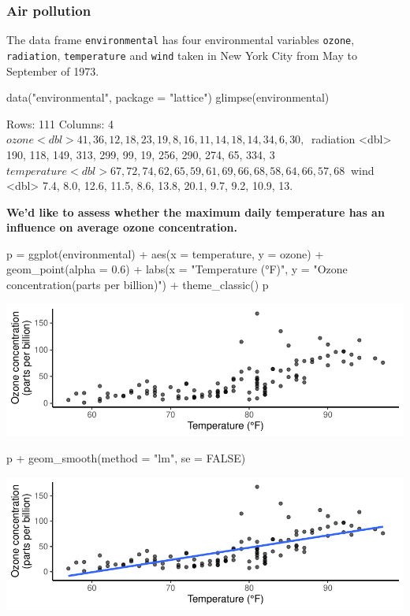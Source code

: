\documentclass[a4paper]{article}
\begin{document}
\subsubsection{Air pollution}
The data frame \lstinline|environmental| has four environmental variables \lstinline|ozone|, \lstinline|radiation|, \lstinline|temperature| and \lstinline|wind| taken in New York City from May to September of 1973.
\begin{Schunk}
\begin{Sinput}
data("environmental", package = "lattice")
glimpse(environmental)
\end{Sinput}
\begin{Soutput}
Rows: 111
Columns: 4
$ ozone       <dbl> 41, 36, 12, 18, 23, 19, 8, 16, 11, 14, 18, 14, 34, 6, 30, ~
$ radiation   <dbl> 190, 118, 149, 313, 299, 99, 19, 256, 290, 274, 65, 334, 3~
$ temperature <dbl> 67, 72, 74, 62, 65, 59, 61, 69, 66, 68, 58, 64, 66, 57, 68~
$ wind        <dbl> 7.4, 8.0, 12.6, 11.5, 8.6, 13.8, 20.1, 9.7, 9.2, 10.9, 13.~
\end{Soutput}
\end{Schunk}
\begin{greenbox}
	\textbf{We'd like to assess whether the maximum daily temperature has an influence on average ozone concentration.}
\end{greenbox}
\begin{Schunk}
\begin{Sinput}
p = ggplot(environmental) + aes(x = temperature, y = ozone) + 
  geom_point(alpha = 0.6) + 
  labs(x = "Temperature (°F)", y = "Ozone concentration\n(parts per billion)") +
  theme_classic()
p
\end{Sinput}


{\centering \includegraphics[width=\maxwidth]{figure/listings-unnamed-chunk-334-1} 

}

\begin{Sinput}
p + geom_smooth(method = "lm", se = FALSE)
\end{Sinput}


{\centering \includegraphics[width=\maxwidth]{figure/listings-unnamed-chunk-334-2} 

}

\end{Schunk}
\end{document}
